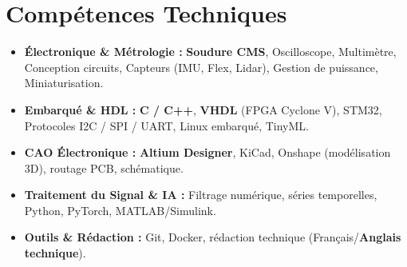 \documentclass[a4paper,11pt]{article}
\begin{document}
\section{Compétences Techniques}
\begin{itemize}[leftmargin=*, nosep]
    \item \small{\textbf{Électronique \& Métrologie :} \textbf{Soudure CMS}, Oscilloscope, Multimètre, Conception circuits, Capteurs (IMU, Flex, Lidar), Gestion de puissance, Miniaturisation.}
    \item \small{\textbf{Embarqué \& HDL :} \textbf{C / C++}, \textbf{VHDL} (FPGA Cyclone V), STM32, Protocoles I2C / SPI / UART, Linux embarqué, TinyML.}
    \item \small{\textbf{CAO Électronique :} \textbf{Altium Designer}, KiCad, Onshape (modélisation 3D), routage PCB, schématique.}
    \item \small{\textbf{Traitement du Signal \& IA :} Filtrage numérique, séries temporelles, Python, PyTorch, MATLAB/Simulink.}
    \item \small{\textbf{Outils \& Rédaction :} Git, Docker, rédaction technique (Français/\textbf{Anglais technique}).}
\end{itemize}

\end{document}
